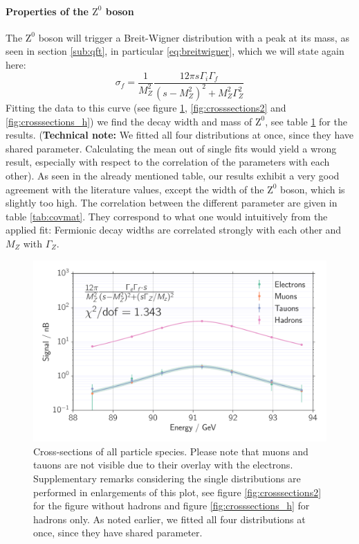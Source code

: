 \paragraph{\textbf{Properties of the $\mathrm{Z^0}$ boson}}
\label{par:Z0}
The $\mathrm{Z^0}$ boson will trigger a Breit-Wigner distribution
with a peak at its mass, as seen in section \ref{sub:qft}, in particular
\eqref{eq:breitwigner}, which we will state again here:
\begin{equation*}
    \sigma_f = \frac{1}{M_Z^2} \frac{12\pi s \Gamma_i \Gamma_f }{(s- M_Z^2)^2 + M_Z^2 \Gamma_Z^2}
\end{equation*}
Fitting the data to this curve (see figure \ref{fig:crosssections}, \ref{fig:crosssections2} and \ref{fig:crosssections_h}) we
find the decay width and mass of $\mathrm{Z^0}$, see table \ref{fig:crosssections} for the results. (\textbf{Technical note:} We 
fitted all four distributions at once, since they have shared parameter. Calculating the mean out of single fits would
yield a wrong result, especially with respect to the correlation of the parameters with each other). 
As seen in the already mentioned table, our results exhibit a very good agreement with the literature
values, except the width of the $\mathrm{Z^0}$ boson, which is slightly too high. The correlation between the different parameter are 
given in table \ref{tab:covmat}. They correspond to what one would intuitively from the applied fit: Fermionic decay
widths are correlated strongly with each other and $M_Z$ with $\Gamma_Z$.

\begin{figure}[htpb]
    \centering
    \includegraphics[width=1.0\linewidth]{figures/crosssections}
    \caption{Cross-sections of all particle species. Please note that muons and tauons
        are not visible due to their overlay with the electrons. 
        Supplementary remarks considering the single 
    distributions are performed in enlargements of this plot, see figure \ref{fig:crosssections2} for the figure without hadrons
    and figure \ref{fig:crosssections_h} for hadrons only. As noted earlier, we 
fitted all four distributions at once, since they have shared parameter. 
    }
    \label{fig:crosssections}
\end{figure}



